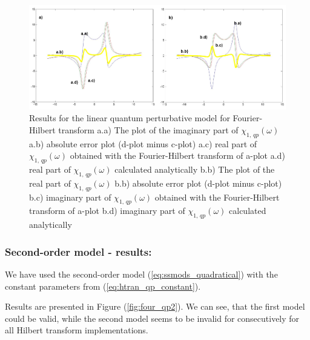 \documentclass[12pt,twoside,a4paper]{article}
\numberwithin{equation}{subsection}
\numberwithin{figure}{subsection}
\begin{document}
\begin{figure}
  \includegraphics[width=150mm]{img/four_qp1.png}
  \caption{Results for the linear quantum perturbative model for Fourier-Hilbert transform
    a.a) The plot of the imaginary part of ${\chi_{1, \, qp}}(\omega )$
    a.b) absolute error plot (d-plot minus c-plot) 
    a.c) real part of ${\chi_{1, \, qp}}(\omega )$ obtained with the Fourier-Hilbert transform of a-plot 
    a.d) real part of ${\chi_{1, \, qp}}(\omega )$ calculated analytically 
    b.b) The plot of the real part of ${\chi_{1, \, qp}}(\omega )$ 
    b.b) absolute error plot (d-plot minus c-plot) 
    b.c) imaginary part of ${\chi_{1, \, qp}}(\omega )$ obtained with the Fourier-Hilbert transform of a-plot 
    b.d) imaginary part of ${\chi_{1, \, qp}}(\omega )$ calculated analytically  
    \label{fig:four_qp1}
  }
\end{figure}

\subsubsection*{Second-order model - results:}

We have used the second-order model (\ref{eq:ssmods_quadratical}) with the constant parameters from (\ref{eq:htran_qp_constant}).

Results are presented in Figure (\ref{fig:four_qp2}). We can see, that the first model could be valid, while the second model seems to be invalid for consecutively for all Hilbert transform implementations.
\end{document}
